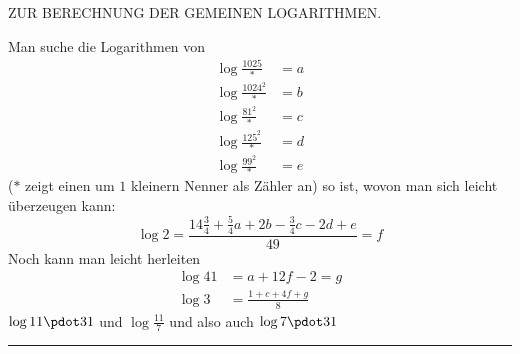 \clearpage
{}%
\renewcommand{\BookRunningTitle}{Zur Berechnung der gemeinen Logarithmen}
\begin{center}\Large ZUR BERECHNUNG DER GEMEINEN LOGARITHMEN.\end{center}
Man suche die Logarithmen von
\[
\begin{aligned}
\log\frac{1025}{*}&=a\\
\log\frac{1024^2}{*}&=b\\
\log\frac{81^2}{*}&=c\\
\log\frac{125^2}{*}&=d\\
\log\frac{99^2}{*}&=e
\end{aligned}
\]
($*$ zeigt einen um $1$ kleinern Nenner als Zähler an) so ist, wovon man sich leicht überzeugen kann:
\[
\log 2=\frac{14\frac34+\frac54a+2b-\frac34c-2d+e}{49}=f
\]
Noch kann man leicht herleiten
\[
\begin{aligned}
\log 41&=a+12f-2=g\\
\log 3&=\frac{1+c+4f+g}{8}
\end{aligned}
\]
$\log 11\pdot31$ und $\log\frac{11}{7}$ und also auch $\log 7\pdot31$\par\medskip\noindent\rule{.32\textwidth}{.3pt}
